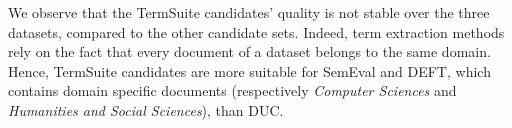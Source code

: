       We observe that the TermSuite candidates' quality is not stable over the
      three datasets, compared to the other candidate sets. Indeed, term
      extraction methods rely on the fact that every document of a dataset
      belongs to the same domain. Hence, TermSuite candidates are more suitable
      for SemEval and DEFT, which contains domain specific documents
      (respectively \textit{Computer Sciences} and \textit{Humanities and Social
      Sciences}), than DUC.

